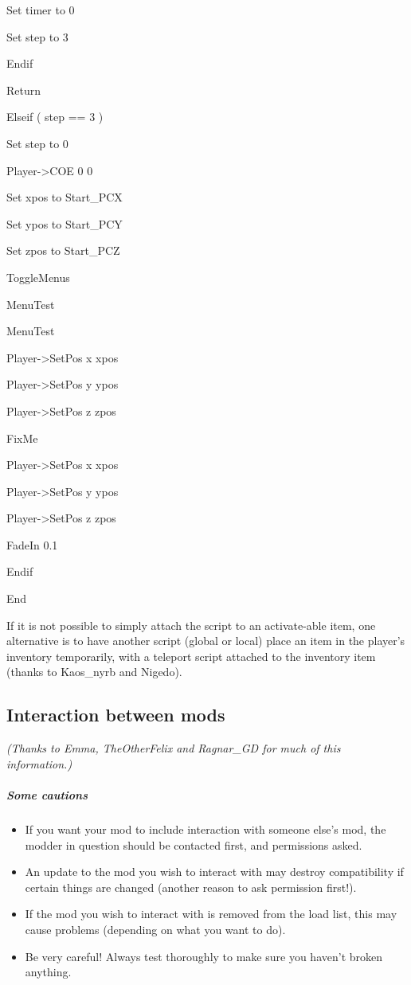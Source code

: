 \documentclass[
]{article}
\begin{document}
Set timer to 0

Set step to 3

Endif

Return

Elseif ( step == 3 )

Set step to 0

Player-\textgreater COE 0 0

Set xpos to Start\_PCX

Set ypos to Start\_PCY

Set zpos to Start\_PCZ

ToggleMenus

MenuTest

MenuTest

Player-\textgreater SetPos x xpos

Player-\textgreater SetPos y ypos

Player-\textgreater SetPos z zpos

FixMe

Player-\textgreater SetPos x xpos

Player-\textgreater SetPos y ypos

Player-\textgreater SetPos z zpos

FadeIn 0.1

Endif

End

If it is not possible to simply attach the script to an activate-able
item, one alternative is to have another script (global or local) place
an item in the player's inventory temporarily, with a teleport script
attached to the inventory item (thanks to Kaos\_nyrb and Nigedo).

\hypertarget{interaction-between-mods}{%
\subsection{\texorpdfstring{\hfill\break
Interaction between
mods}{ Interaction between mods}}\label{interaction-between-mods}}

\emph{(Thanks to Emma, TheOtherFelix and Ragnar\_GD for much of this
information.)}

\hypertarget{some-cautions}{%
\subparagraph{Some cautions}\label{some-cautions}}

\begin{itemize}
\item
  If you want your mod to include interaction with someone else's mod,
  the modder in question should be contacted first, and permissions
  asked.
\item
  An update to the mod you wish to interact with may destroy
  compatibility if certain things are changed (another reason to ask
  permission first!).
\item
  If the mod you wish to interact with is removed from the load list,
  this may cause problems (depending on what you want to do).
\item
  Be very careful! Always test thoroughly to make sure you haven't
  broken anything.
\end{itemize}
\end{document}
